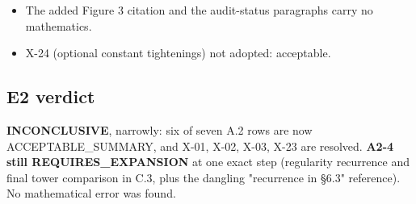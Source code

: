 \documentclass[
]{article}
\providecommand{\tightlist}{%
  \setlength{\itemsep}{0pt}\setlength{\parskip}{0pt}}
\begin{document}
\begin{itemize}
\tightlist
\item
  The added Figure 3 citation and the audit-status paragraphs carry no
  mathematics.
\item
  X-24 (optional constant tightenings) not adopted: acceptable.
\end{itemize}

\subsection{E2 verdict}\label{e2-verdict}

\textbf{INCONCLUSIVE}, narrowly: six of seven A.2 rows are now
ACCEPTABLE\_SUMMARY, and X-01, X-02, X-03, X-23 are resolved.
\textbf{A2-4 still REQUIRES\_EXPANSION} at one exact step (regularity
recurrence and final tower comparison in C.3, plus the dangling
"recurrence in §6.3" reference). No mathematical error was found.
\end{document}
